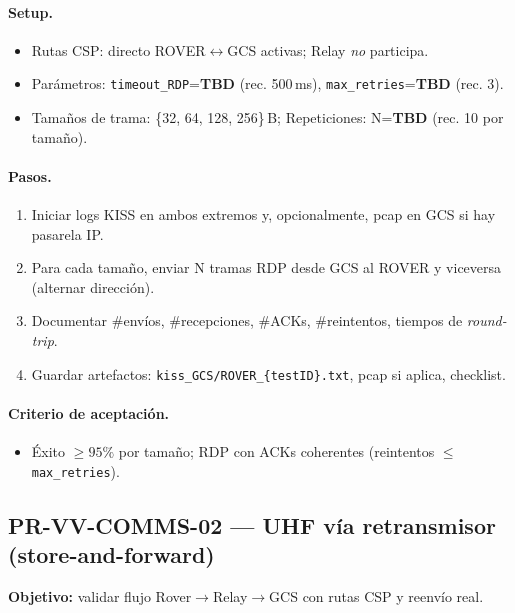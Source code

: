 \paragraph{Setup.}
\begin{itemize}
  \item Rutas CSP: directo ROVER$\leftrightarrow$GCS activas; Relay \emph{no} participa.
  \item Parámetros: \texttt{timeout\_RDP}=\textbf{TBD} (rec. 500\,ms), \texttt{max\_retries}=\textbf{TBD} (rec. 3).
  \item Tamaños de trama: \{32, 64, 128, 256\}\,B; Repeticiones: N=\textbf{TBD} (rec. 10 por tamaño).
\end{itemize}

\paragraph{Pasos.}
\begin{enumerate}
  \item Iniciar logs KISS en ambos extremos y, opcionalmente, pcap en GCS si hay pasarela IP.
  \item Para cada tamaño, enviar N tramas RDP desde GCS al ROVER y viceversa (alternar dirección).
  \item Documentar \#envíos, \#recepciones, \#ACKs, \#reintentos, tiempos de \emph{round-trip}.
  \item Guardar artefactos: \texttt{kiss\_GCS/ROVER\_\{testID\}.txt}, pcap si aplica, checklist.
\end{enumerate}

\paragraph{Criterio de aceptación.}
\begin{itemize}
  \item Éxito $\ge 95\%$ por tamaño; RDP con ACKs coherentes (reintentos $\leq$ \texttt{max\_retries}).
\end{itemize}

\subsection*{PR-VV-COMMS-02 — UHF vía retransmisor (store-and-forward)}
\textbf{Objetivo:} validar flujo Rover$\rightarrow$Relay$\rightarrow$GCS con rutas CSP y reenvío real.

